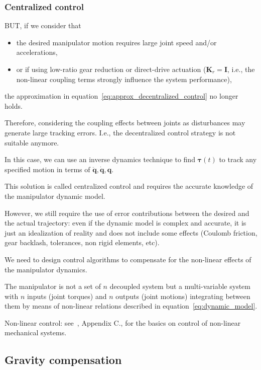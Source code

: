 \documentclass[10pt, aspectratio=169]{beamer}
\theoremstyle{remark}
\theoremstyle{definition}
\begin{document}
\begin{frame}[allowframebreaks]
\frametitle{Centralized control}
	BUT, if we consider that
    \begin{itemize}
        \item the desired manipulator motion requires large joint speed and/or accelerations,
        \item or if using low-ratio gear reduction or direct-drive actuation ($\mathbf{K}_r = \mathbf{I}$, i.e., the non-linear coupling terms strongly influence the system performance),
    \end{itemize}
    the approximation in equation~\ref{eq:approx_decentralized_control} no longer holds.
    
    Therefore, considering the coupling effects between joints as disturbances may generate large tracking errors. I.e., the decentralized control strategy is not suitable anymore.

    In this case, we can use an inverse dynamics technique to find $\boldsymbol{\tau}(t)$ to track any specified motion in terms of $\ddot{\mathbf{q}}, \dot{\mathbf{q}}, \mathbf{q}$. 

    \framebreak
    This solution is called centralized control and requires the accurate knowledge of the manipulator dynamic model.

   However, we still require the use of error contributions between the desired and the actual trajectory: even if the dynamic model is complex and accurate, it is just an idealization of reality and does not include some effects (Coulomb friction, gear backlash, tolerances, non rigid elements, etc).

    We need to design control algorithms to compensate for the non-linear effects of the manipulator dynamics.

    The manipulator is not a set of $n$ decoupled system but a multi-variable system with $n$ inputs (joint torques) and $n$ outputs (joint motions) integrating between them by means of non-linear relations described in equation~\ref{eq:dynamic_model}.
    
    Non-linear control: see~\cite{sciavicco2010robotics}, Appendix C., for the basics on control of non-linear mechanical systems.
    
\end{frame}

\subsection{Gravity compensation}
\end{document}

